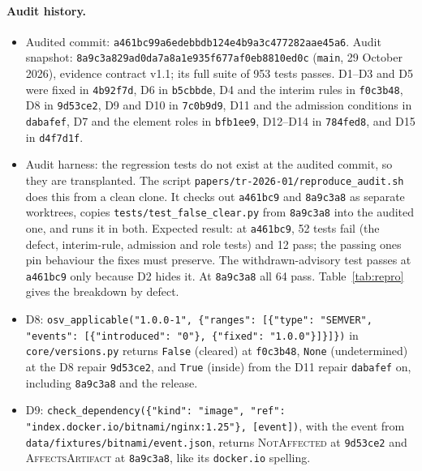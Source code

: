 \documentclass[11pt,a4paper]{article}
\newcommand{\code}[1]{\texttt{#1}}
\newcommand{\commit}{\code{a461bc9}}
\newcommand{\fixcommit}{\code{4b92f7d}}
\newcommand{\dsixcommit}{\code{b5cbbde}}
\newcommand{\dfourcommit}{\code{f0c3b48}}
\newcommand{\deightcommit}{\code{9d53ce2}}
\newcommand{\dninecommit}{\code{7c0b9d9}}
\newcommand{\delevencommit}{\code{dabafef}}
\newcommand{\dsevencommit}{\code{bfb1ee9}}
\newcommand{\dtwelvecommit}{\code{784fed8}}
\newcommand{\dfifteencommit}{\code{d4f7d1f}}
\newcommand{\pincommit}{\code{8a9c3a8}}
\begin{document}
\paragraph{Audit history.}
\begin{itemize}[leftmargin=*,nosep]
  \item Audited commit: \code{a461bc99a6edebbdb124e4b9a3c477282aae45a6}.
    Audit snapshot:
    \code{8a9c3a829ad0da7a8a1e935f677af0eb8810ed0c} (\code{main}, 29
    October 2026), evidence contract v1.1; its full suite of 953 tests
    passes. D1--D3 and D5 were fixed in \fixcommit{}, D6 in
    \dsixcommit{}, D4 and the interim rules in \dfourcommit{}, D8 in
    \deightcommit{}, D9 and D10 in \dninecommit{}, D11 and the
    admission conditions in \delevencommit{}, D7 and the element roles
    in \dsevencommit{}, D12--D14 in \dtwelvecommit{}, and D15 in
    \dfifteencommit{}.
  \item Audit harness: the regression tests do not exist at the
    audited commit, so they are transplanted. The script
    \code{papers/tr-2026-01/reproduce\_audit.sh} does this from a
    clean clone. It checks out \commit{} and \pincommit{} as separate
    worktrees, copies \code{tests/test\_false\_clear.py} from
    \pincommit{} into the audited one, and runs it in both. Expected
    result: at \commit{}, 52 tests fail (the defect, interim-rule, admission and role
    tests) and 12 pass; the passing ones pin behaviour the fixes must
    preserve. The withdrawn-advisory test passes at \commit{} only
    because D2 hides it. At \pincommit{} all 64 pass.
    Table~\ref{tab:repro} gives the breakdown by defect.
  \item D8: \code{osv\_applicable("1.0.0-1", \{"ranges":
    [\{"type": "SEMVER", "events": [\{"introduced": "0"\},
    \{"fixed": "1.0.0"\}]\}]\})} in \code{core/versions.py} returns
    \code{False} (cleared) at \dfourcommit{}, \code{None}
    (undetermined) at the D8 repair \deightcommit{}, and \code{True}
    (inside) from the D11 repair \delevencommit{} on, including
    \pincommit{} and the release.
  \item D9: \code{check\_dependency(\{"kind": "image", "ref":
    "index.docker.io/bitnami/nginx:1.25"\}, [event])}, with the event
    from \code{data/fixtures/bitnami/event.json}, returns
    \textsc{NotAffected} at \deightcommit{} and
    \textsc{AffectsArtifact} at \pincommit{}, like its
    \code{docker.io} spelling.
\end{itemize}
\end{document}
